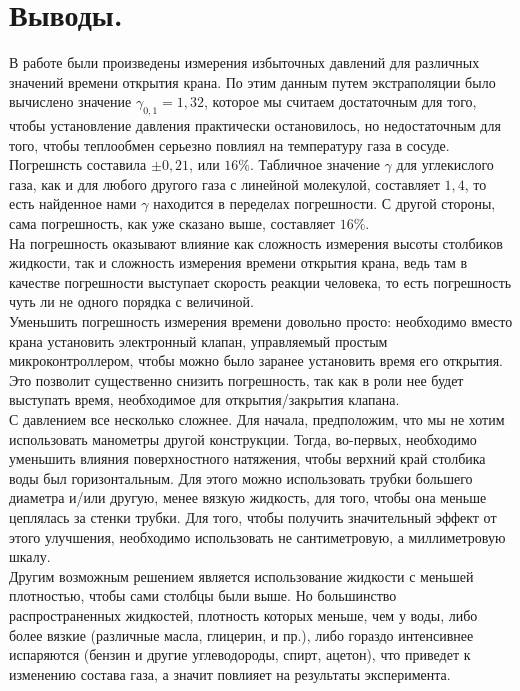 \documentclass[a4paper,11pt]{article}
\begin{document}
\section{Выводы.}
В работе были произведены измерения избыточных давлений для различных значений времени открытия крана. По этим данным путем экстраполяции было вычислено значение $\gamma_{0,1} = 1,32$, которое мы считаем достаточным для того, чтобы установление давления практически остановилось, но недостаточным для того, чтобы теплообмен серьезно повлиял на температуру газа в сосуде. Погрешнсть составила $\pm 0,21$, или $16\%$. Табличное значение $\gamma$ для углекислого газа, как и для любого другого газа с линейной молекулой, составляет $1,4$, то есть найденное нами $\gamma$ находится в переделах погрешности. С другой стороны, сама погрешность, как уже сказано выше, составляет $16\%$.\\
На погрешность оказывают влияние как сложность измерения высоты столбиков жидкости, так и сложность измерения времени открытия крана, ведь там в качестве погрешности выступает скорость реакции человека, то есть погрешность чуть ли не одного порядка с величиной.\\
Уменьшить погрешность измерения времени довольно просто: необходимо вместо крана установить электронный клапан, управляемый простым микроконтроллером, чтобы можно было заранее установить время его открытия. Это позволит существенно снизить погрешность, так как в роли нее будет выступать время, необходимое для открытия/закрытия клапана.\\
С давлением все несколько сложнее. Для начала, предположим, что мы не хотим использовать манометры другой конструкции. Тогда, во-первых, необходимо уменьшить влияния поверхностного натяжения, чтобы верхний край столбика воды был горизонтальным. Для этого можно использовать трубки большего диаметра и/или другую, менее вязкую жидкость, для того, чтобы она меньше цеплялась за стенки трубки. Для того, чтобы получить значительный эффект от этого улучшения, необходимо использовать не сантиметровую, а миллиметровую шкалу.\\
Другим возможным решением является использование жидкости с меньшей плотностью, чтобы сами столбцы были выше. Но большинство распространенных жидкостей, плотность которых меньше, чем у воды, либо более вязкие (различные масла, глицерин, и пр.), либо гораздо интенсивнее испаряются (бензин и другие углеводороды, спирт, ацетон), что приведет к изменению состава газа, а значит повлияет на результаты эксперимента.
\end{document}
